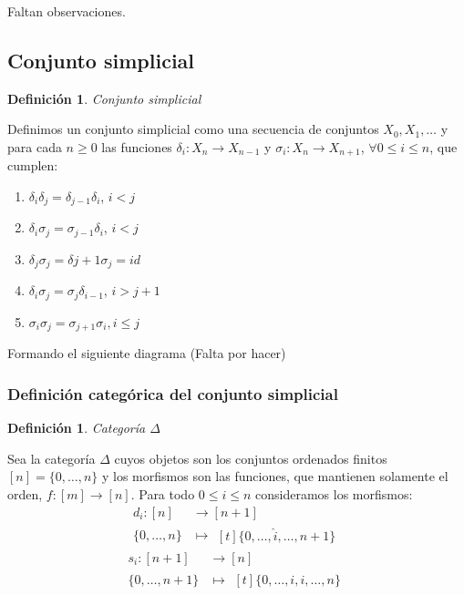 \documentclass[11pt,a4paper,openright,oneside]{article}
\numberwithin{equation}{section}
\newtheorem{defi}[teo]{Definici\'on}
\theoremstyle{definition}
\begin{document}
Faltan observaciones.

\subsection{Conjunto simplicial}
\begin{defi}
    Conjunto simplicial
\end{defi}
Definimos un conjunto simplicial como una secuencia de conjuntos $X_0,X_1,\dots$ y para cada $n\ge 0$ las funciones $\delta_i: X_n \longrightarrow X_{n-1}$ y $\sigma_i: X_n \longrightarrow X_{n+1}$, $\forall 0\le i \le n$, que cumplen:

\begin{enumerate}[(1)]
    \item $\delta_i\delta_j = \delta_{j-1}\delta_{i}$, $i<j$
    \item $\delta_i\sigma_j = \sigma_{j-1}\delta_{i}$, $i<j$
    \item $\delta_j\sigma_j = \delta{j+1}\sigma_{j} = id$
    \item $\delta_i\sigma_j = \sigma_{j}\delta_{i-1}$, $i>j+1$
    \item $\sigma_i\sigma_j = \sigma_{j+1}\sigma_{i}, i\le j$
\end{enumerate}
Formando el siguiente diagrama (Falta por hacer)

\subsubsection{Definici\'on categ\'orica del conjunto simplicial}
\begin{defi}
    Categor\'ia $\Delta$
\end{defi}
Sea la categor\'ia $\Delta$ cuyos objetos son los conjuntos ordenados finitos $[n] = \{0,\dots,n\}$ y los morfismos son las funciones, que mantienen solamente el orden, $f: [m] \longrightarrow [n]$.
Para todo $0\le i \le n$ consideramos los morfismos:
\begin{align*}
    d_i: [n]      & \longrightarrow [n+1] \\
    \{0,\dots,n\} & \longmapsto\!
    \begin{aligned}[t]
        \{0,\dots, \hat{i}, \dots,n+1\}
    \end{aligned}
\end{align*}
\begin{align*}
    s_i: [n+1]      & \longrightarrow [n] \\
    \{0,\dots,n+1\} & \longmapsto\!
    \begin{aligned}[t]
        \{0,\dots,i,i, \dots,n\}
    \end{aligned}
\end{align*}
\end{document}
